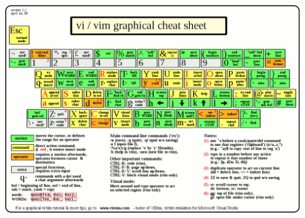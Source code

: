 \documentclass{beamer}
\begin{document}
\begin{frame}
    \begin{center}
        \includegraphics[width=1\textwidth]{images/cheat-sheet.png}
    \end{center}
\end{frame}
\end{document}
